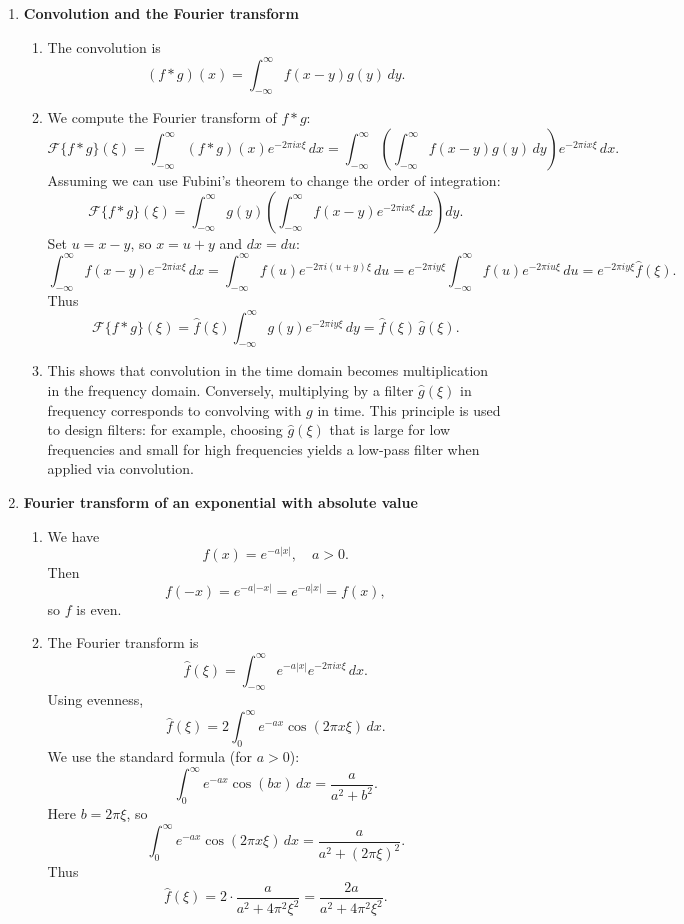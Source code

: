 \documentclass[11pt]{article}
\begin{document}
\begin{enumerate}
\bigskip
\item \textbf{Convolution and the Fourier transform}

\begin{enumerate}
\item The convolution is
\[
(f*g)(x)=\int_{-\infty}^{\infty} f(x-y)g(y)\,dy.
\]

\item We compute the Fourier transform of $f*g$:
\[
\mathcal{F}\{f*g\}(\xi)
= \int_{-\infty}^{\infty} (f*g)(x)e^{-2\pi i x\xi}\,dx
= \int_{-\infty}^{\infty}\left(\int_{-\infty}^{\infty} f(x-y)g(y)\,dy\right)e^{-2\pi i x\xi}\,dx.
\]
Assuming we can use Fubini's theorem to change the order of integration:
\[
\mathcal{F}\{f*g\}(\xi)
= \int_{-\infty}^{\infty} g(y)\left(\int_{-\infty}^{\infty} f(x-y)e^{-2\pi i x\xi}\,dx\right)dy.
\]
Set $u=x-y$, so $x=u+y$ and $dx=du$:
\[
\int_{-\infty}^{\infty} f(x-y)e^{-2\pi i x\xi}\,dx
= \int_{-\infty}^{\infty} f(u)e^{-2\pi i (u+y)\xi}\,du
= e^{-2\pi i y\xi}\int_{-\infty}^{\infty} f(u)e^{-2\pi i u\xi}\,du
= e^{-2\pi i y\xi}\hat f(\xi).
\]
Thus
\[
\mathcal{F}\{f*g\}(\xi)
= \hat f(\xi)\int_{-\infty}^{\infty} g(y)e^{-2\pi i y\xi}\,dy
= \hat f(\xi)\,\hat g(\xi).
\]

\item This shows that convolution in the time domain becomes multiplication in the frequency domain. Conversely, multiplying by a filter $\hat g(\xi)$ in frequency corresponds to convolving with $g$ in time. This principle is used to design filters: for example, choosing $\hat g(\xi)$ that is large for low frequencies and small for high frequencies yields a low-pass filter when applied via convolution.
\end{enumerate}

\bigskip
\item \textbf{Fourier transform of an exponential with absolute value}

\begin{enumerate}
\item We have
\[
f(x)=e^{-a|x|},\quad a>0.
\]
Then
\[
f(-x)=e^{-a|-x|}=e^{-a|x|}=f(x),
\]
so $f$ is even.

\item The Fourier transform is
\[
\hat f(\xi)=\int_{-\infty}^{\infty} e^{-a|x|}e^{-2\pi i x\xi}\,dx.
\]
Using evenness,
\[
\hat f(\xi)
= 2\int_{0}^{\infty} e^{-ax}\cos(2\pi x\xi)\,dx.
\]
We use the standard formula (for $a>0$):
\[
\int_{0}^{\infty} e^{-ax}\cos(bx)\,dx = \frac{a}{a^2+b^2}.
\]
Here $b=2\pi\xi$, so
\[
\int_{0}^{\infty} e^{-ax}\cos(2\pi x\xi)\,dx
= \frac{a}{a^2+(2\pi\xi)^2}.
\]
Thus
\[
\hat f(\xi) = 2\cdot \frac{a}{a^2+4\pi^2\xi^2}
= \frac{2a}{a^2+4\pi^2\xi^2}.
\]


\end{enumerate}
\end{enumerate}
\end{document}
